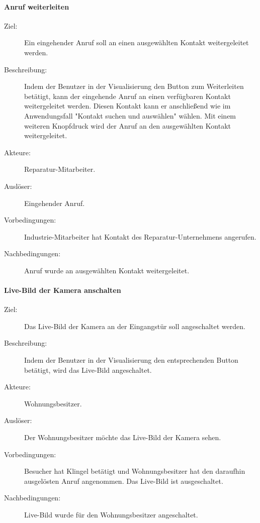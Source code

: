 \paragraph{\large{Anruf weiterleiten}}
    \begin{description}
        \item[Ziel:] Ein eingehender Anruf soll an einen ausgewählten Kontakt weitergeleitet werden.
        \item[Beschreibung:] Indem der Benutzer in der Visualisierung den Button zum Weiterleiten betätigt, kann der eingehende Anruf an einen verfügbaren Kontakt weitergeleitet werden.
            Diesen Kontakt kann er anschließend wie im Anwendungsfall "Kontakt suchen und auswählen" wählen.
            Mit einem weiteren Knopfdruck wird der Anruf an den ausgewählten Kontakt weitergeleitet.
        \item[Akteure:] Reparatur-Mitarbeiter.
        \item[Auslöser:] Eingehender Anruf.
        \item[Vorbedingungen:] Industrie-Mitarbeiter hat Kontakt des Reparatur-Unternehmens angerufen.
        \item[Nachbedingungen:] Anruf wurde an ausgewählten Kontakt weitergeleitet.
    \end{description}

\paragraph{\large{Live-Bild der Kamera anschalten}}
    \begin{description}
        \item[Ziel:] Das Live-Bild der Kamera an der Eingangstür soll angeschaltet werden.
        \item[Beschreibung:] Indem der Benutzer in der Visualisierung den entsprechenden Button betätigt, wird das Live-Bild angeschaltet.
        \item[Akteure:] Wohnungsbesitzer.
        \item[Auslöser:] Der Wohnungsbesitzer möchte das Live-Bild der Kamera sehen.
        \item[Vorbedingungen:] Besucher hat Klingel betätigt und Wohnungsbesitzer hat den daraufhin ausgelösten Anruf angenommen.
            Das Live-Bild ist ausgeschaltet.
        \item[Nachbedingungen:] Live-Bild wurde für den Wohnungsbesitzer angeschaltet.
    \end{description}

